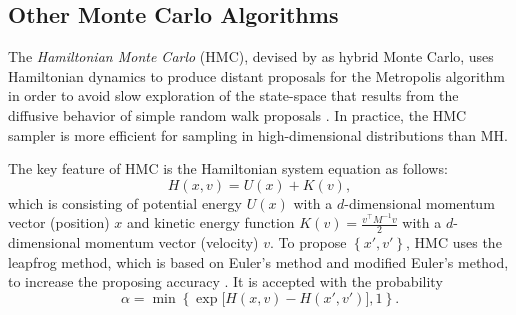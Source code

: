 %
%



\subsection*{Other Monte Carlo Algorithms}

The \textit{Hamiltonian Monte Carlo} (HMC), devised by \cite{duane1987hybrid} as hybrid Monte Carlo, uses Hamiltonian dynamics to produce distant proposals for the Metropolis algorithm in order to avoid slow exploration of the state-space that results from the diffusive behavior of simple random walk proposals \citep{neal2011mcmc}. In practice, the HMC sampler is more efficient for sampling in high-dimensional distributions than MH.

The key feature of HMC is the Hamiltonian system equation as follows: 
\begin{equation*}
H(x,v) = U(x)+K(v),
\end{equation*}
which is consisting of potential energy $U(x)$ with a $d$-dimensional momentum vector (position) $x$ and kinetic energy function $K(v)=\frac{v^\top M^{-1}v}{2}$ with a $d$-dimensional momentum vector (velocity) $v$. To propose $\left\lbrace x',v'\right\rbrace$, HMC uses the leapfrog method, which is based on Euler's method and modified Euler's method, to increase the proposing accuracy \citep{betancourt2017conceptual}. It is accepted with the probability
\begin{equation*}
\alpha = \min\left\lbrace\exp\lbrack H(x,v)-H(x',v') \rbrack, 1\right\rbrace.
\end{equation*}

